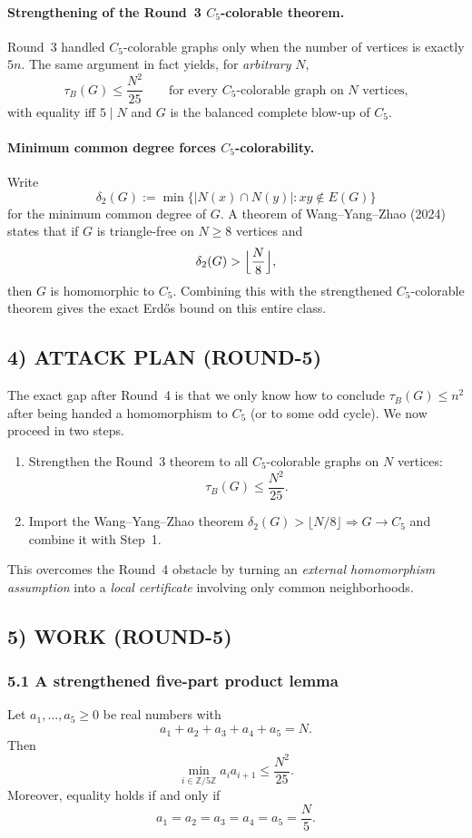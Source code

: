 \paragraph{Strengthening of the Round~3 $C_5$-colorable theorem.}
Round~3 handled $C_5$-colorable graphs only when the number of vertices is exactly $5n$.
The same argument in fact yields, for \emph{arbitrary} $N$,
\[
\tau_B(G)\le \frac{N^2}{25}
\qquad\text{for every $C_5$-colorable graph on $N$ vertices,}
\]
with equality iff $5\mid N$ and $G$ is the balanced complete blow-up of $C_5$.

\paragraph{Minimum common degree forces $C_5$-colorability.}
Write
\[
\delta_2(G):=\min\{|N(x)\cap N(y)|:xy\notin E(G)\}
\]
for the minimum common degree of $G$.
A theorem of Wang--Yang--Zhao (2024) states that if $G$ is triangle-free on $N\ge 8$ vertices and
\[
\delta_2(G)>\Bigl\lfloor\frac{N}{8}\Bigr\rfloor,
\]
then $G$ is homomorphic to $C_5$.
Combining this with the strengthened $C_5$-colorable theorem gives the exact Erd\H{o}s bound on this
entire class.

\subsection*{4) ATTACK PLAN (ROUND-5)}
The exact gap after Round~4 is that we only know how to conclude $\tau_B(G)\le n^2$ after being
handed a homomorphism to $C_5$ (or to some odd cycle).  We now proceed in two steps.
\begin{enumerate}
\item Strengthen the Round~3 theorem to all $C_5$-colorable graphs on $N$ vertices:
\[
\tau_B(G)\le \frac{N^2}{25}.
\]
\item Import the Wang--Yang--Zhao theorem $\delta_2(G)>\lfloor N/8\rfloor\Rightarrow G\to C_5$ and
      combine it with Step~1.
\end{enumerate}
This overcomes the Round~4 obstacle by turning an \emph{external homomorphism assumption} into a
\emph{local certificate} involving only common neighborhoods.

\subsection*{5) WORK (ROUND-5)}

\subsubsection*{5.1 A strengthened five-part product lemma}
\begin{lemma}\label{lem:adjprod_general5}
Let $a_1,\dots,a_5\ge 0$ be real numbers with
\[
a_1+a_2+a_3+a_4+a_5=N.
\]
Then
\[
\min_{i\in\mathbb Z/5\mathbb Z} a_i a_{i+1}\le \frac{N^2}{25}.
\]
Moreover, equality holds if and only if
\[
a_1=a_2=a_3=a_4=a_5=\frac{N}{5}.
\]
\end{lemma}

